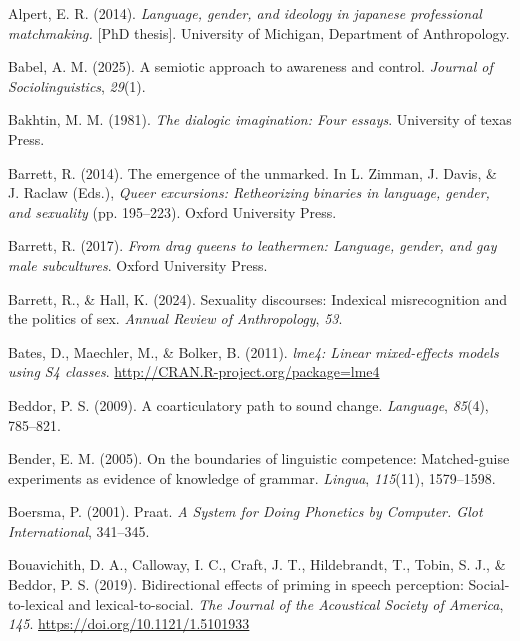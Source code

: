 \documentclass[
  letterpaper,
  DIV=11,
  numbers=noendperiod]{scrartcl}
\newlength{\cslhangindent}
\newenvironment{CSLReferences}[2] %
 {\begin{list}{}{%
  \setlength{\itemindent}{0pt}
  \setlength{\leftmargin}{0pt}
  \setlength{\parsep}{0pt}
  \ifodd #1
   \setlength{\leftmargin}{\cslhangindent}
   \setlength{\itemindent}{-1\cslhangindent}
  \fi
  \setlength{\itemsep}{#2\baselineskip}}}
 {\end{list}}
\begin{document}
\label{refs}
\begin{CSLReferences}{1}{0}
Alpert, E. R. (2014). \emph{Language, gender, and ideology in japanese
professional matchmaking.} {[}PhD thesis{]}. University of Michigan,
Department of Anthropology.

Babel, A. M. (2025). A semiotic approach to awareness and control.
\emph{Journal of Sociolinguistics}, \emph{29}(1).

Bakhtin, M. M. (1981). \emph{The dialogic imagination: Four essays}.
University of texas Press.

Barrett, R. (2014). The emergence of the unmarked. In L. Zimman, J.
Davis, \& J. Raclaw (Eds.), \emph{Queer excursions: Retheorizing
binaries in language, gender, and sexuality} (pp. 195--223). Oxford
University Press.

Barrett, R. (2017). \emph{From drag queens to leathermen: Language,
gender, and gay male subcultures}. Oxford University Press.

Barrett, R., \& Hall, K. (2024). Sexuality discourses: Indexical
misrecognition and the politics of sex. \emph{Annual Review of
Anthropology}, \emph{53}.

Bates, D., Maechler, M., \& Bolker, B. (2011). \emph{lme4: Linear
mixed-effects models using S4 classes}.
\url{http://CRAN.R-project.org/package=lme4}

Beddor, P. S. (2009). A coarticulatory path to sound change.
\emph{Language}, \emph{85}(4), 785--821.

Bender, E. M. (2005). On the boundaries of linguistic competence:
Matched-guise experiments as evidence of knowledge of grammar.
\emph{Lingua}, \emph{115}(11), 1579--1598.

Boersma, P. (2001). Praat. \emph{A System for Doing Phonetics by
Computer. {Glot} {International}}, 341--345.

Bouavichith, D. A., Calloway, I. C., Craft, J. T., Hildebrandt, T.,
Tobin, S. J., \& Beddor, P. S. (2019). Bidirectional effects of priming
in speech perception: Social-to-lexical and lexical-to-social. \emph{The
Journal of the Acoustical Society of America}, \emph{145}.
\url{https://doi.org/10.1121/1.5101933}


\end{CSLReferences}
\end{document}
